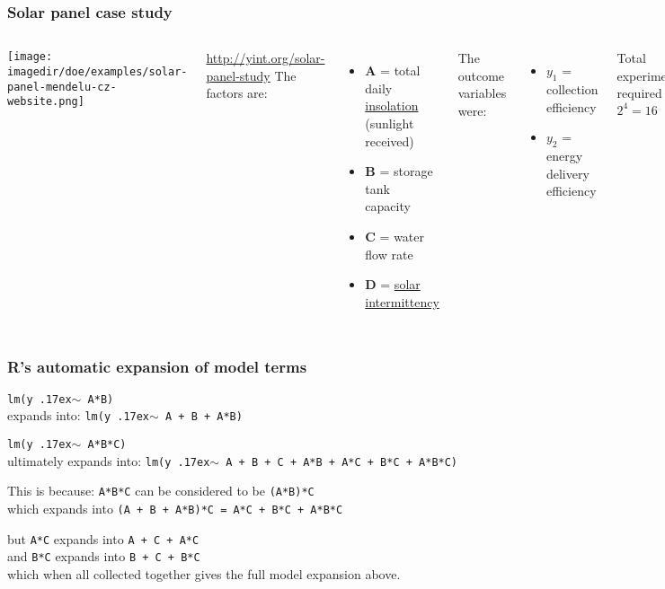 \begin{frame}\frametitle{Solar panel case study}
	
	\begin{columns}[T]
			
			\texttt{[image: \\imagedir/doe/examples/solar-panel-mendelu-cz-website.png]}
			
			
			\href{http://yint.org/solar-panel-study}{http://yint.org/solar-panel-study}
			The factors are:
			\begin{itemize}
				\item	\textbf{A} = total daily \href{https://en.wikipedia.org/wiki/Insolation}{insolation} (sunlight received)
				\item	\textbf{B} = storage tank capacity
				\item	\textbf{C} = water flow rate
				\item	\textbf{D} = \href{https://en.wikipedia.org/wiki/Intermittent\_energy\_source }{solar intermittency}
			\end{itemize}
			\pause
			\vspace{12pt}
			The outcome variables were:
			\begin{itemize}
				\item	$y_1$ = collection efficiency
				\item	$y_2$ = energy delivery efficiency
			\end{itemize}
			\pause
			\vspace{12pt}
			Total experiments required = \pause $2^4 = 16$ 
			
	\end{columns}
\end{frame}

\begin{frame}\frametitle{R's automatic expansion of model terms}
	\texttt{lm(y {\raise.17ex\hbox{$\scriptstyle\mathtt{\sim}$}} A*B)}\\
		\qquad expands into: {\color{blue}\texttt{lm(y {\raise.17ex\hbox{$\scriptstyle\mathtt{\sim}$}} A + B + A*B)}}
		
	\vspace{24pt}
	\texttt{lm(y {\raise.17ex\hbox{$\scriptstyle\mathtt{\sim}$}} A*B*C)}\\
		\qquad ultimately expands into: {\color{blue}\texttt{lm(y {\raise.17ex\hbox{$\scriptstyle\mathtt{\sim}$}} A + B + C + A*B + A*C + B*C + A*B*C)}}
		
		\vspace{12pt}
		\qquad 
		This is because: \texttt{A*B*C} can be considered to be \texttt{(A*B)*C} \\
		\qquad which expands into \texttt{(A + B + A*B)*C = A*C + B*C + A*B*C}
		
		\vspace{6pt}
		\qquad  but \texttt{A*C} expands into \texttt{A + C + A*C}\\
		\qquad  and \texttt{B*C} expands into \texttt{B + C + B*C} \\
		\qquad which when all collected together gives the full model expansion above.
		
		
	
\end{frame}


